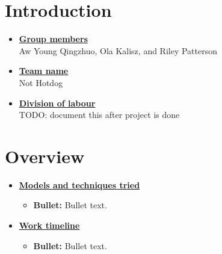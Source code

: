 \newif\ifshowsolutions
\showsolutionstrue

\newcommand{\boldline}[1]{\underline{\textbf{#1}}}



\pagestyle{fancy}



\section{Introduction}
\medskip
\begin{itemize}

    \item \boldline{Group members} \\
    Aw Young Qingzhuo, Ola Kalisz, and Riley Patterson
    
    \item \boldline{Team name} \\
    Not Hotdog
    
    \item \boldline{Division of labour} \\
    TODO: document this after project is done

\end{itemize}



\section{Overview}
\medskip
\begin{itemize}

    \item \boldline{Models and techniques tried}
    \begin{itemize}
    \item \textbf{Bullet:} Bullet text.
    \end{itemize}

    \item \boldline{Work timeline}
    \begin{itemize}
    \item \textbf{Bullet:} Bullet text.
    \end{itemize}

\end{itemize}



